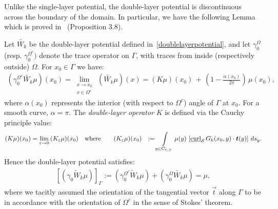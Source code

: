 Unlike the single-layer potential, the double-layer potential is
discontinuous across the boundary of the domain.  In particular, we have
the following Lemma which is proved in~\cite{mit:tay1999} (Proposition
3.8).
\begin{lemma} 
\label{l:DLPjump} 
Let $\widetilde{W_k}$ be the double-layer potential defined
in~\eqref{doublelayerpotential}, and let $\gamma_0^{\Omega}$ (resp.
$\gamma_0^{\Omega^c})$ denote the trace operator on $\Gamma$, with
traces from inside (respectively outside) $\Omega$.  For $x_{0} \in
\Gamma$ we have:
\begin{align*} 
  (\gamma^{\Omega^{c}}_0\widetilde{W_k}\mu)(x_0)=
  \lim\limits_{\substack{x \to x_0 \\ x \in \Omega^{c}}}\, 
  (\widetilde{W_k}\mu)(x) =
  (K\mu)(x_0)\,+\,\left(1-\frac{\alpha(x_0)}{2\pi}\right)\,\mu(x_0),
\end{align*}
where $\alpha(x_{0})$ represents the interior (with respect to
$\Omega^{c}$) angle of $\Gamma$ at $x_{0}$. For a smooth curve, $\alpha
= \pi$. The {\it double-layer operator} $K$ is defined via the Cauchy
principle value: 
\begin{align*}
  (K\mu)(x_0)&=\lim_{\varepsilon\rightarrow 0}
  \, (K_{\varepsilon}\mu)(x_0) \quad \mbox{where}\qquad
  (K_{\varepsilon}\mu)(x_0)&:=\int\limits_{y\in C_{\epsilon,\geq}} 
  \mu(y)\,\left[\underline{\mbox{curl}}_{\S}
  \,G_k(x_{0},y)\cdot\vec{t}(y)\right]\,ds_{y}.
\end{align*}
Hence the double-layer potential satisfies:
\begin{align*}
  \left[(\gamma_0\widetilde W_k\mu) \right]_\Gamma := 
  (\gamma^{\Omega^{c}}_0\widetilde W_k\mu)+(\gamma^{\Omega}_{0} 
  \widetilde{W_k}\mu)=\mu,
\end{align*}
where we tacitly assumed the orientation of the tangential vector
$\vec{t}$ along $\Gamma$ to be in accordance with the orientation of
$\Omega^{c}$ in the sense of Stokes' theorem.

\end{lemma}

